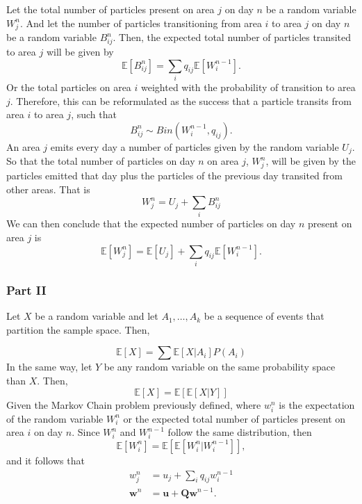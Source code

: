 \documentclass[11pt, a4paper]{article}
\begin{document}
Let the total number of particles present on area $j$ on day $n$ be a random variable $W_j^n$. And let the number of particles transitioning from area $i$ to area $j$ on day $n$ be a random variable $B_{ij}^{n}$.
Then, the expected total number of particles transited to area $j$ will be given by 
\[
	\mathbb{E}[B_{ij}^{n}] = \sum_i q_{ij}\mathbb{E}[W_i^{n-1}].
\]
Or the total particles on area $i$ weighted with the probability of transition to area $j$. Therefore, this can be reformulated as the success that a particle transits from area $i$ to area $j$, such that
\[
	B_{ij}^n \sim Bin(W_i^{n-1}, q_{ij}).
\]
An area $j$ emits every day a number of particles given by the random variable $U_j$. So that the total number of particles on day $n$ on area $j$, $W_j^n$, will be given by the particles emitted that day plus the particles of the previous day transited from other areas. That is
\[
	W_j^n = U_j + \sum_iB_{ij}^n
\]
We can then conclude that the expected number of particles on day $n$ present on area $j$ is
\[
	\mathbb{E}[W_j^n] = \mathbb{E}[U_j] + \sum_i q_{ij}\mathbb{E}[W_i^{n-1}].
\]

\subsubsection*{Part II}
Let $X$ be a random variable and let $A_1, \dots, A_k$ be a sequence of events that partition the sample space. Then, 

\[
\mathbb{E}[X] = \sum \mathbb{E}[X|A_i]P(A_i)
\]
In the same way, let $Y$ be any random variable on the same probability space than $X$. Then,
\[
\mathbb{E}[X] = \mathbb{E}[\mathbb{E}[X|Y]]
\]
Given the Markov Chain problem previously defined, where $w_i^n$ is the expectation of the random variable $W_i^n$ or the expected total number of particles present on area $i$ on day $n$. 
Since $W_i^n$ and $W_i^{n-1}$ follow the same distribution, then
\[
\mathbb{E}[W_i^n] = \mathbb{E}[\mathbb{E}[W_i^n | W_i^{n-1}]],
\]
and it follows that
\[
\begin{aligned}
w_j^n &= u_j + \sum_i q_{ij}w_i^{n-1} \\
\mathbf w^n &= \mathbf u + \mathbf Q\mathbf w^{n-1}. 
\end{aligned}
\]
\end{document}
